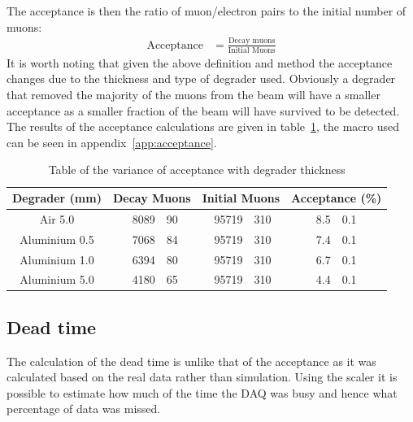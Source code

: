 \documentclass[]{article}
\begin{document}
The acceptance is then the ratio of muon/electron pairs to the initial number of muons:
\begin{align}
    \text{Acceptance} &= \frac{\text{Decay muons}}{\text{Initial Muons}} \label{equ:acceptance}
\end{align}
It is worth noting that given the above definition and method the acceptance changes due to the thickness and type of degrader used. Obviously a degrader that removed the majority of the muons from the beam will have a smaller acceptance as a smaller fraction of the beam will have survived to be detected. The results of the acceptance calculations are given in table~\ref{tab:acceptance}, the macro used can be seen in appendix~\ref{app:acceptance}.
\begin{table}
    \begin{center}
    \begin{tabular}{c| r@{ $\pm$ }l | r@{ $\pm$ }l | r@{ $\pm$ }l }
        Degrader (mm) & \multicolumn{2}{|c}{Decay Muons} & \multicolumn{2}{|c}{Initial Muons} & \multicolumn{2}{|c}{Acceptance (\%)}\\
        \hline
        Air 5.0       & 8089 & 90 & 95719 & 310 & 8.5 & 0.1 \\
        Aluminium 0.5 & 7068 & 84 & 95719 & 310 & 7.4 & 0.1 \\
        Aluminium 1.0 & 6394 & 80 & 95719 & 310 & 6.7 & 0.1 \\
        Aluminium 5.0 & 4180 & 65 & 95719 & 310 & 4.4 & 0.1 \\
    \end{tabular}
    \end{center}
    \caption{Table of the variance of acceptance with degrader thickness}
    \label{tab:acceptance}
\end{table}
\subsection{Dead time} %
\label{sub:dead_time}
The calculation of the dead time is unlike that of the acceptance as it was calculated based on the real data rather than simulation. Using the scaler it is possible to estimate how much of the time the DAQ was busy and hence what percentage of data was missed. 
\end{document}
